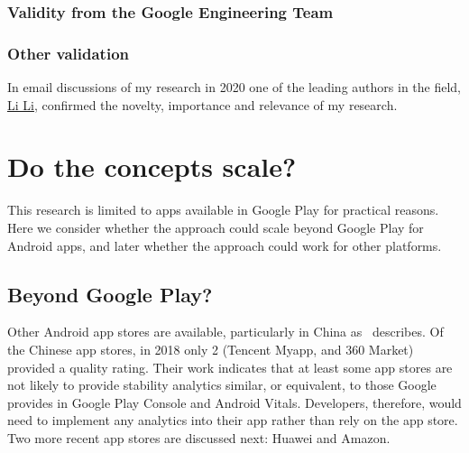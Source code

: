 \subsubsection{Validity from the Google Engineering Team}



\subsubsection{Other validation}
In email discussions of my research in 2020 one of the leading authors in the field, \href{https://scholar.google.com/citations?user=zuUsFkgAAAAJ&hl=en&oi=sra}{Li Li}, confirmed the novelty, importance and relevance of my research.



\section{Do the concepts scale?}
This research is limited to apps available in Google Play for practical reasons. Here we consider whether the approach could scale beyond Google Play for Android apps, and later whether the approach could work for other platforms.

\subsection{Beyond Google Play?}
Other Android app stores are available, particularly in China as~\citep{wang2018_beyond_google_play} describes. Of the Chinese app stores, in 2018 only 2 (Tencent Myapp, and 360 Market) provided a quality rating. Their work indicates that at least some app stores are not likely to provide stability analytics similar, or equivalent, to those Google provides in Google Play Console and Android Vitals. Developers, therefore, would need to implement any analytics into their app rather than rely on the app store. Two more recent app stores are discussed next: Huawei and Amazon.

